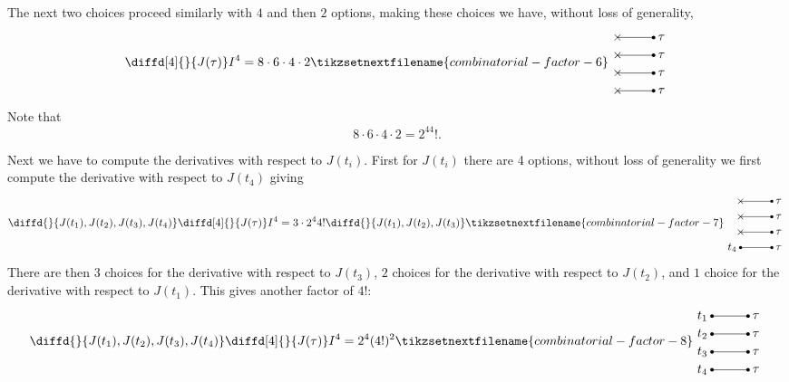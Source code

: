         The next two choices proceed similarly with \(4\) and then \(2\) options, making these choices we have, without loss of generality,
        \begin{equation}
            \diffd[4]{}{J(\tau)} I^4 = 8 \cdot 6 \cdot 4 \cdot 2 
            \tikzsetnextfilename{combinatorial-factor-6}
            \begin{tikzpicture}[baseline=0.7cm]
                \foreach \y in {0, 0.5, 1, 1.5} {
                    \draw (0, \y) -- (1, \y);
                    \node at (0, \y) {\(\times\)};
                    \fill (1, \y) circle [radius = 0.05] node[right] {\(\tau\)};
                }
            \end{tikzpicture}
        \end{equation}
        Note that
        \begin{equation}
            8 \cdot 6 \cdot 4 \cdot 2 = 2^44!.
        \end{equation}
        
        Next we have to compute the derivatives with respect to \(J(t_i)\).
        First for \(J(t_i)\) there are 4 options, without loss of generality we first compute the derivative with respect to \(J(t_4)\) giving
        \begin{equation*}
            \diffd{}{J(t_1),J(t_2),J(t_3),J(t_4)}\diffd[4]{}{J(\tau)} I^4 = 3 \cdot 2^44! \diffd{}{J(t_1),J(t_2),J(t_3)}
            \tikzsetnextfilename{combinatorial-factor-7}
            \begin{tikzpicture}[baseline=0.7cm]
                \foreach \y in {0, 0.5, 1, 1.5} {
                    \draw (0, \y) -- (1, \y);
                    \fill (1, \y) circle [radius = 0.05] node[right] {\(\tau\)};
                }
                \foreach \y in {0.5, 1, 1.5} {\node at (0, \y) {\(\times\)};}
                \fill (0, 0) circle [radius = 0.05] node[left] {\(t_4\)};
            \end{tikzpicture}
        \end{equation*}
        There are then \(3\) choices for the derivative with respect to \(J(t_3)\), \(2\) choices for the derivative with respect to \(J(t_2)\), and \(1\) choice for the derivative with respect to \(J(t_1)\).
        This gives another factor of \(4!\):
        \begin{equation}
            \diffd{}{J(t_1),J(t_2),J(t_3),J(t_4)}\diffd[4]{}{J(\tau)} I^4 = 2^4(4!)^2
            \tikzsetnextfilename{combinatorial-factor-8}
            \begin{tikzpicture}[baseline=0.7cm]
                \foreach \y in {0, 0.5, 1, 1.5} {
                    \draw (0, \y) -- (1, \y);
                    \fill (1, \y) circle [radius = 0.05] node[right] {\(\tau\)};
                    \fill (0, \y) circle [radius = 0.05] node[left] {\(t_{\pgfmathparse{int(4 - 2*\y)}\pgfmathresult}\)};
                }
            \end{tikzpicture}
        \end{equation}
        

